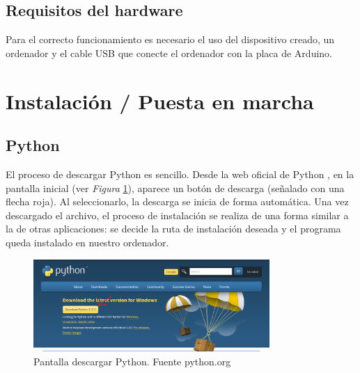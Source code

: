 \subsection{Requisitos del hardware}
Para el correcto funcionamiento es necesario el uso del dispositivo creado, un ordenador y el cable USB que conecte el ordenador con la placa de Arduino.
\section{Instalación / Puesta en marcha}
\subsection{Python}

El proceso de descargar Python es sencillo. Desde la web oficial de Python \cite{Python}, en la pantalla inicial (ver \textit{Figura} \ref{fig:Python}), aparece un botón de descarga (señalado con una flecha roja). Al seleccionarlo, la descarga se inicia de forma automática. Una vez descargado el archivo, el proceso de instalación se realiza de una forma similar a la de otras aplicaciones: se decide la ruta de instalación deseada y el programa queda instalado en nuestro ordenador.

\begin{figure}[h]
        \centering
        \includegraphics[width=0.8\textwidth]{img/pantalla inicio python.png}
        \caption{Pantalla descargar Python. Fuente python.org}
        \label{fig:Python}
    \end{figure}
